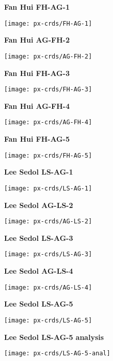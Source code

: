 \documentclass[12pt]{article}
\begin{document}

\hfill{\bf Fan Hui FH-AG-1}\hfill\ 


\texttt{[image: px-crds/FH-AG-1]}%

\newpage
\hfill{\bf Fan Hui AG-FH-2}\hfill\ 

\texttt{[image: px-crds/AG-FH-2]}%

\newpage
\hfill{\bf Fan Hui FH-AG-3}\hfill\ 

\texttt{[image: px-crds/FH-AG-3]}%

\newpage
\hfill{\bf Fan Hui AG-FH-4}\hfill\ 

\texttt{[image: px-crds/AG-FH-4]}%

\newpage
\hfill{\bf Fan Hui FH-AG-5}\hfill\ 

\texttt{[image: px-crds/FH-AG-5]}%

\newpage
\hfill{\bf Lee Sedol LS-AG-1}\hfill\ 

\texttt{[image: px-crds/LS-AG-1]}%

\newpage
\hfill{\bf Lee Sedol AG-LS-2}\hfill\ 

\texttt{[image: px-crds/AG-LS-2]}%

\newpage
\hfill{\bf Lee Sedol LS-AG-3}\hfill\ 

\texttt{[image: px-crds/LS-AG-3]}%

\newpage
\hfill{\bf Lee Sedol AG-LS-4}\hfill\ 

\texttt{[image: px-crds/AG-LS-4]}%

\newpage
\hfill{\bf Lee Sedol LS-AG-5}\hfill\ 

\texttt{[image: px-crds/LS-AG-5]}%

\newpage
\hfill{\bf Lee Sedol LS-AG-5 analysis}\hfill\ 

\texttt{[image: px-crds/LS-AG-5-anal]}%
\end{document}
